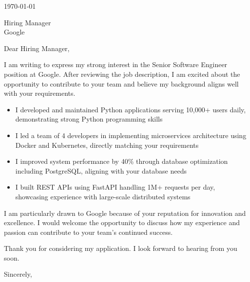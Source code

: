 \documentclass[11pt,letterpaper]{article}
\begin{document}
\noindent
\today

\vspace{1em}

\noindent
Hiring Manager \\
Google \\

\vspace{1em}

\noindent
Dear Hiring Manager,

I am writing to express my strong interest in the Senior Software Engineer position at Google. After reviewing the job description, I am excited about the opportunity to contribute to your team and believe my background aligns well with your requirements.

\begin{itemize}[leftmargin=*]
\item I developed and maintained Python applications serving 10,000+ users daily, demonstrating strong Python programming skills
\item I led a team of 4 developers in implementing microservices architecture using Docker and Kubernetes, directly matching your requirements
\item I improved system performance by 40\% through database optimization including PostgreSQL, aligning with your database needs
\item I built REST APIs using FastAPI handling 1M+ requests per day, showcasing experience with large-scale distributed systems
\end{itemize}

I am particularly drawn to Google because of your reputation for innovation and excellence. I would welcome the opportunity to discuss how my experience and passion can contribute to your team's continued success.

Thank you for considering my application. I look forward to hearing from you soon.

\vspace{1em}

\noindent
Sincerely, \\
[Your Name]
\end{document}
